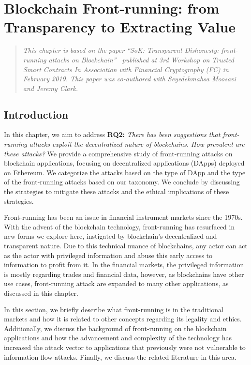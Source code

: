 

\chapter{Blockchain Front-running: from Transparency to Extracting Value} \label{sec:frontrunning}



\begin{quote}
	\textit{This chapter is based on the paper ``SoK: Transparent Dishonesty: front-running attacks on Blockchain''~\cite{eskandari2019sok} published at 3rd Workshop on Trusted Smart Contracts In Association with Financial Cryptography (FC) in February 2019. This paper was co-authored with Seyedehmahsa Moosavi and Jeremy Clark.}
\end{quote}


\section{Introduction}
In this chapter, we aim to address \textbf{RQ2:} \textit{There has been suggestions that front-running attacks exploit the decentralized nature of blockchains. How prevalent are these attacks?} We provide a comprehensive study of front-running attacks on blockchain applications, focusing on decentralized applications (DApps) deployed on Ethereum. We categorize the attacks based on the type of DApp and the type of the front-running attacks based on our taxonomy. We conclude by discussing the strategies to mitigate these attacks and the ethical implications of these strategies.

Front-running has been an issue in financial instrument markets since the 1970s. With the advent of the blockchain technology, front-running has resurfaced in new forms we explore here, instigated by blockchain's decentralized and transparent nature. Due to this technical nuance of blockchains, any actor can act as the actor with privileged information and abuse this early access to information to profit from it. In the financial markets, the privileged information is mostly regarding trades and financial data, however, as blockchains have other use cases, front-running attack are expanded to many other applications, as discussed in this chapter. 

In this section, we briefly describe what front-running is in the traditional markets and how it is related to other concepts regarding its legality and ethics. Additionally, we discuss the background of front-running on the blockchain applications and how the advancement and complexity of the technology has increased the attack vector to applications that previously were not vulnerable to information flow attacks. Finally, we discuss the related literature in this area. 


